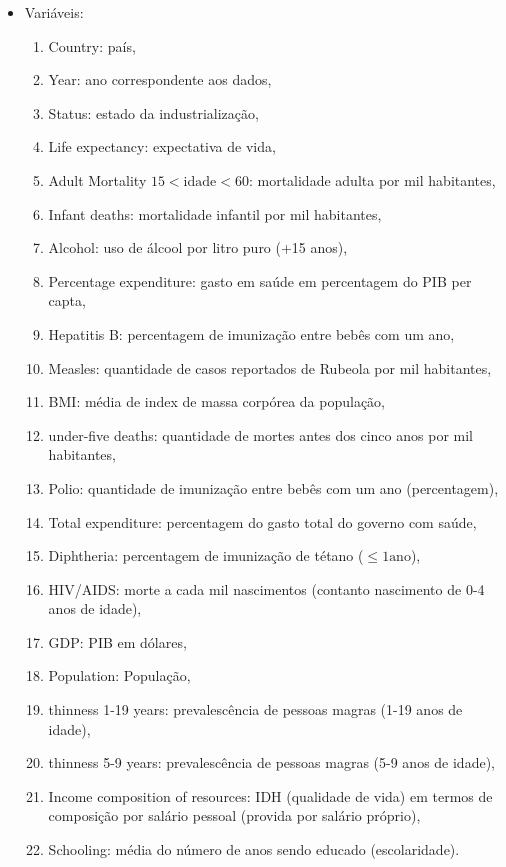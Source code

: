 \documentclass[11pt]{article}
\begin{document}
\begin{itemize}
\item Variáveis:
\begin{enumerate}
\item Country: país,
\item Year: ano correspondente aos dados,
\item Status: estado da industrialização,
\item Life expectancy: expectativa de vida,
\item Adult Mortality \(15<\text{idade}<60\): mortalidade adulta por mil habitantes,
\item Infant deaths: mortalidade infantil por mil habitantes,
\item Alcohol: uso de álcool por litro puro (+15 anos),
\item Percentage expenditure: gasto em saúde em percentagem do PIB per capta,
\item Hepatitis B: percentagem de imunização entre bebês com um ano,
\item Measles: quantidade de casos reportados de Rubeola por mil habitantes,
\item BMI: média de index de massa corpórea da população,
\item under-five deaths: quantidade de mortes antes dos cinco anos por mil habitantes,
\item Polio: quantidade de imunização entre bebês com um ano (percentagem),
\item Total expenditure: percentagem do gasto total do governo com saúde,
\item Diphtheria: percentagem de imunização de tétano (\(\leq 1 \text{ano}\)),
\item HIV/AIDS: morte a cada mil nascimentos (contanto nascimento de 0-4 anos de idade),
\item GDP: PIB em dólares,
\item Population: População,
\item thinness  1-19 years: prevalescência de pessoas magras (1-19 anos de idade),
\item thinness 5-9 years: prevalescência de pessoas magras (5-9 anos de idade),
\item Income composition of resources: IDH (qualidade de vida) em termos de composição por salário pessoal (provida por salário próprio),
\item Schooling: média do número de anos sendo educado (escolaridade).
\end{enumerate}
\end{itemize}
\end{document}
